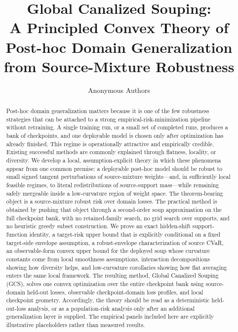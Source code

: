 \documentclass[11pt]{article}
\title{\vspace{-1.0em}\bfseries Global Canalized Souping:\\
A Principled Convex Theory of Post-hoc Domain Generalization from Source-Mixture Robustness}
\author{Anonymous Authors}
\date{}
\newcommand{\1}{\mathbf{1}}
\theoremstyle{plain}
\theoremstyle{definition}
\theoremstyle{remark}
\begin{document}
\maketitle

\begin{abstract}
Post-hoc domain generalization matters because it is one of the few robustness strategies that can be attached to a strong empirical-risk-minimization pipeline without retraining. A single training run, or a small set of completed runs, produces a bank of checkpoints, and one deployable model is chosen only after optimization has already finished. This regime is operationally attractive and empirically credible. Existing successful methods are commonly explained through flatness, locality, or diversity. We develop a local, assumption-explicit theory in which these phenomena appear from one common premise: a deployable post-hoc model should be robust to small signed tangent perturbations of source-mixture weights---and, in sufficiently local feasible regimes, to literal redistributions of source-support mass---while remaining safely mergeable inside a low-curvature region of weight space. The theorem-bearing object is a source-mixture robust risk over domain losses. The practical method is obtained by pushing that object through a second-order soup approximation on the full checkpoint bank, with no retained-family search, no grid search over supports, and no heuristic greedy subset construction. We prove an exact hidden-shift support-function identity, a target-risk upper bound that is explicitly conditional on a fixed target-side envelope assumption, a robust-envelope characterization of source CVaR, an observable-form convex upper bound for the deployed soup whose curvature constants come from local smoothness assumptions, interaction decompositions showing how diversity helps, and low-curvature corollaries showing how flat averaging enters the same local framework. The resulting method, Global Canalized Souping (GCS), solves one convex optimization over the entire checkpoint bank using source-domain held-out losses, observable checkpoint-domain loss profiles, and local checkpoint geometry. Accordingly, the theory should be read as a deterministic held-out-loss analysis, or as a population-risk analysis only after an additional generalization layer is supplied. The empirical panels included here are explicitly illustrative placeholders rather than measured results.\vspace{-0.25em}
\end{abstract}
\end{document}
